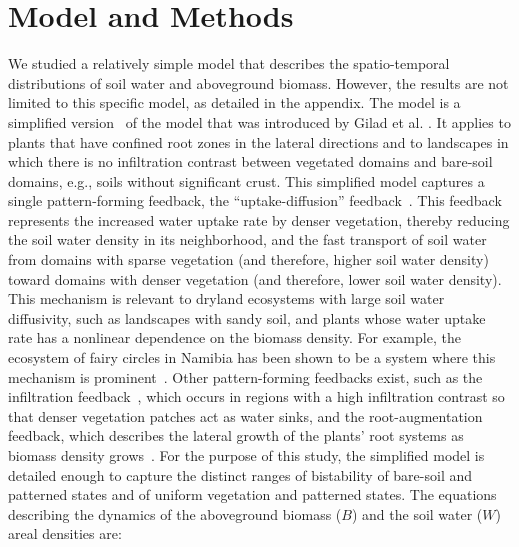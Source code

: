 \documentclass[aps,prl,preprint,superscriptaddress,floatfix]{revtex4-1}
\begin{document}
\section{Model and Methods}\label{sec:model}
We studied a relatively simple model that describes the spatio-temporal distributions of soil water and aboveground biomass.
However, the results are not limited to this specific model, as detailed in the appendix.
The model is a simplified version~\cite{zelnik2013regime} of the model that was introduced by Gilad et al. \cite{Gilad2004prl,Gilad2007jtb}.
It applies to plants that have confined root zones in the lateral directions and to landscapes in which there is no infiltration contrast between vegetated domains and bare-soil domains, e.g., soils without significant crust.
This simplified model captures a single pattern-forming feedback, the ``uptake-diffusion'' feedback~\cite{Kinast2014prl}. 
This feedback represents the increased water uptake rate by denser vegetation, thereby reducing the soil water density in its neighborhood, 
and the fast transport of soil water from domains with sparse vegetation (and therefore, higher soil water density) toward domains with denser vegetation (and therefore, lower soil water density).
This mechanism is relevant to dryland ecosystems with large soil water diffusivity, such as landscapes with sandy soil, and plants whose water uptake rate has a nonlinear dependence on the biomass density. 
For example, the ecosystem of fairy circles in Namibia has been shown to be a system where this mechanism is prominent~\cite{Zelnik2015}.
Other pattern-forming feedbacks exist, such as the infiltration feedback~\cite{Rietkerk2011,meron2012ecomod,Kinast2014prl}, which occurs in regions with a high infiltration contrast 
so that denser vegetation patches act as water sinks, and the root-augmentation feedback, which describes the lateral growth of the plants' root systems as biomass density grows~\cite{Gilad2007jtb,meron2012ecomod}. 
For the purpose of this study, the simplified model is detailed enough to capture the distinct ranges of bistability of bare-soil and patterned states and of uniform vegetation and patterned states.
The equations describing the dynamics of the aboveground biomass ($B$) and the soil water ($W$) areal densities are:
\end{document}
